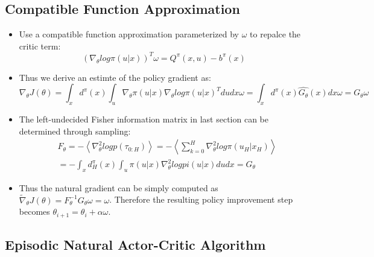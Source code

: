 {\begin{pcolumn}
{\begin{itemize}
\end{itemize}
\vspace*{2mm}
}

\subsection{Compatible Function Approximation}
\vspace*{-17mm}
%
{\large
\begin{itemize}
	\item Use a compatible function approximation parameterized by $\omega$ to repalce the critic term:
\begin{equation}
	(\nabla_\theta log \pi(u | x))^T \omega = Q^\pi(x, u) - b^\pi(x)
\end{equation}
	\item  Thus we derive an estimte of the policy gradient as:
\begin{equation}
	\nabla_\theta J(\theta) = \int_x d^\pi(x) \int_u \nabla_\theta \pi(u | x)\nabla_\theta log \pi(u|x)^T dudx\omega = \int_x d^\pi(x)\hat{G_\theta}(x)dx\omega = G_\theta \omega
\end{equation}
	\item The left-undecided Fisher information matrix in last section can be determined through sampling:
\begin{eqnarray}
	& F_\theta = -\left<\nabla_\theta^2 log p(\tau_{0:H})\right> = -\left<\sum_{k=0}^H \nabla_\theta^2 log \pi(u_H | x_H)\right>  \nonumber \\
	& = - \int_x d_H^\pi (x) \int_u \pi(u|x) \nabla_\theta^2 log pi(u|x)dudx = G_\theta
\end{eqnarray}
	\item Thus the natural gradient can be simply computed as $\widetilde \nabla_\theta J(\theta) = F_\theta^{-1}G_\theta \omega = \omega$. Therefore the resulting policy improvement step becomes $\theta_{i+1} = \theta_i + \alpha\omega$.
\end{itemize}
\vspace*{2mm}
}
\subsection{Episodic Natural Actor-Critic Algorithm}
\vspace*{-17mm}

\end{pcolumn}
%
\hfill
\begin{pcolumn}
%


\end{pcolumn}}
